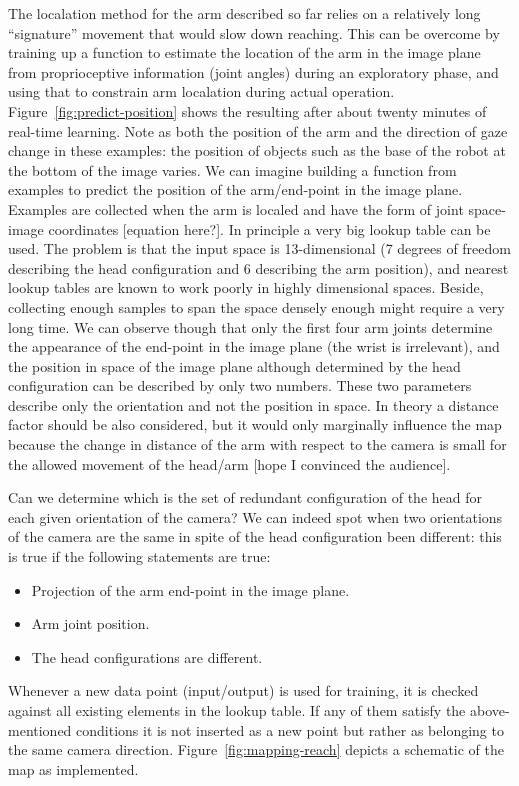 The local\iz{}ation method for the arm described so far relies on a
relatively long ``signature'' movement that would slow down reaching.
This can be overcome by training up a function to estimate the
location of the arm in the image plane from proprioceptive information
(joint angles) during an exploratory phase, and using that to 
constrain arm local\iz{}ation during actual operation.
Figure~\ref{fig:predict-position} shows the resulting \ahhbehavior{}
after about twenty minutes of real-time learning. 
%
\ifverbose
Note as both the
position of the arm and the direction of gaze change in these
examples: the position of objects such as the base of the robot at the
bottom of the image varies.
\fi
%
\ifverbose
We can imagine building a function from examples to predict the
position of the arm/end-point in the image plane. Examples are
collected when the arm is local\iz{}ed and have the form of joint
space-image coordinates [equation here?]. In principle a very big
lookup table can be used. The problem is that the input space is
13-dimensional (7 degrees of freedom describing the head configuration
and 6 describing the arm position), and nearest \neighbor{} lookup tables
are known to work poorly in highly dimensional spaces. Beside,
collecting enough samples to span the space densely enough might
require a very long time. We can observe though that only the first
four arm joints determine the appearance of the end-point in the image
plane (the wrist is irrelevant), and the position in space of the
image plane although determined by the head configuration can be
described by only two numbers. These two parameters describe only the
orientation and not the position in space. In theory a distance factor
should be also considered, but it would only marginally influence the
map because the change in distance of the arm with respect to the
camera is small for the allowed movement of the head/arm [hope I
convinced the audience].
\fi


\ifverbose
Can we determine which is the set of redundant configuration of the
head for each given orientation of the camera? We can indeed spot when
two orientations of the camera are the same in spite of the head
configuration been different: this is true if the following statements
are true:
%
\begin{itemize}
%
\item Projection of the arm end-point in the image plane.
%
\item Arm joint position.
%
\item The head configurations are different.
%
\end{itemize}
%
Whenever a new data point (input/output) is used for training, it is
checked against all existing elements in the lookup table. If any of
them satisfy the above-mentioned conditions it is not inserted as a
new point but rather as belonging to the same camera direction.
Figure~\ref{fig:mapping-reach} depicts a schematic of the map as
implemented.

